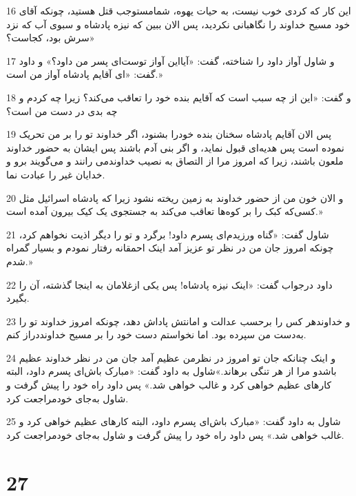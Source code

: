 \par 16 این کار که کردی خوب نیست، به حیات یهوه، شمامستوجب قتل هستید، چونکه آقای خود مسیح خداوند را نگاهبانی نکردید، پس الان ببین که نیزه پادشاه و سبوی آب که نزد سرش بود، کجاست؟»
\par 17 و شاول آواز داود را شناخته، گفت: «آیااین آواز توست‌ای پسر من داود؟» و داود گفت: «ای آقایم پادشاه آواز من است.»
\par 18 و گفت: «این از چه سبب است که آقایم بنده خود را تعاقب می‌کند؟ زیرا چه کردم و چه بدی در دست من است؟
\par 19 پس الان آقایم پادشاه سخنان بنده خودرا بشنود، اگر خداوند تو را بر من تحریک نموده است پس هدیه‌ای قبول نماید، و اگر بنی آدم باشند پس ایشان به حضور خداوند ملعون باشند، زیرا که امروز مرا از التصاق به نصیب خداوندمی رانند و می‌گویند برو و خدایان غیر را عبادت نما.
\par 20 و الان خون من از حضور خداوند به زمین ریخته نشود زیرا که پادشاه اسرائیل مثل کسی‌که کبک را بر کوه‌ها تعاقب می‌کند به جستجوی یک کیک بیرون آمده است.»
\par 21 شاول گفت: «گناه ورزیدم‌ای پسرم داود! برگرد و تو را دیگر اذیت نخواهم کرد، چونکه امروز جان من در نظر تو عزیز آمد اینک احمقانه رفتار نمودم و بسیار گمراه شدم.»
\par 22 داود درجواب گفت: «اینک نیزه پادشاه! پس یکی ازغلامان به اینجا گذشته، آن را بگیرد.
\par 23 و خداوندهر کس را بر‌حسب عدالت و امانتش پاداش دهد، چونکه امروز خداوند تو را به‌دست من سپرده بود. اما نخواستم دست خود را بر مسیح خداونددراز کنم.
\par 24 و اینک چنانکه جان تو امروز در نظرمن عظیم آمد جان من در نظر خداوند عظیم باشدو مرا از هر تنگی برهاند.»شاول به داود گفت: «مبارک باش‌ای پسرم داود، البته کارهای عظیم خواهی کرد و غالب خواهی شد.» پس داود راه خود را پیش گرفت و شاول به‌جای خودمراجعت کرد.
\par 25 شاول به داود گفت: «مبارک باش‌ای پسرم داود، البته کارهای عظیم خواهی کرد و غالب خواهی شد.» پس داود راه خود را پیش گرفت و شاول به‌جای خودمراجعت کرد.
 
\chapter{27}

